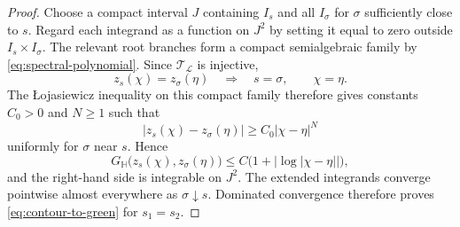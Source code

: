 \documentclass[11pt]{amsart}
\theoremstyle{plain}
\numberwithin{equation}{section}
\numberwithin{theorem}{section}
\numberwithin{figure}{section}
\begin{document}
\begin{proof}
Choose a compact interval \(J\) containing \(I_s\) and all
\(I_\sigma\) for \(\sigma\) sufficiently close to \(s\). Regard each
integrand as a function on \(J^2\) by setting it equal to zero outside
\(I_s\times I_\sigma\). The relevant root branches form a compact semialgebraic family by
\eqref{eq:spectral-polynomial}. Since
\(\mathcal T_{\mathcal L}\) is injective,
\[
    z_s(\chi)=z_\sigma(\eta)
    \quad\Longrightarrow\quad
    s=\sigma,\qquad \chi=\eta.
\]
The Łojasiewicz inequality on this compact family therefore gives
constants \(C_0>0\) and \(N\geq1\) such that
\[
    |z_s(\chi)-z_\sigma(\eta)|
    \geq C_0|\chi-\eta|^N
\]
uniformly for \(\sigma\) near \(s\). Hence
\[
    G_{\mathbb H}
    \bigl(z_s(\chi),z_\sigma(\eta)\bigr)
    \leq
    C\bigl(1+|\log|\chi-\eta||\bigr),
\]
and the right-hand side is integrable on \(J^2\). The extended
integrands converge pointwise almost everywhere as
\(\sigma\downarrow s\). Dominated convergence therefore proves
\eqref{eq:contour-to-green} for \(s_1=s_2\).
\end{proof}
\endgroup
\end{document}
